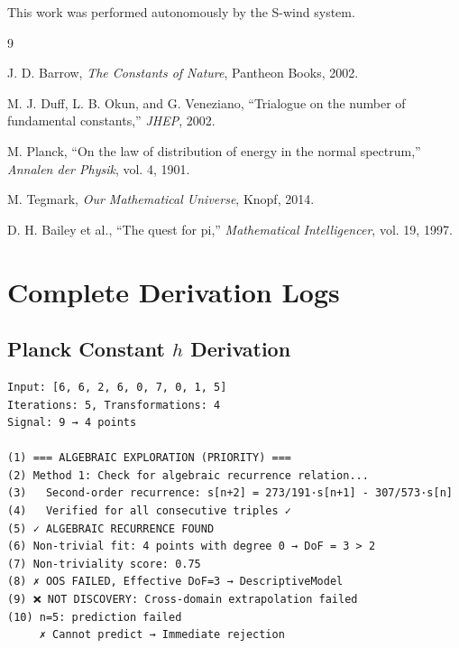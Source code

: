 \documentclass[11pt,a4paper]{article}
\begin{document}
This work was performed autonomously by the S-wind system.


\begin{thebibliography}{9}

J. D. Barrow, \textit{The Constants of Nature}, Pantheon Books, 2002.

M. J. Duff, L. B. Okun, and G. Veneziano, ``Trialogue on the number of fundamental constants,'' \textit{JHEP}, 2002.

M. Planck, ``On the law of distribution of energy in the normal spectrum,'' \textit{Annalen der Physik}, vol. 4, 1901.

M. Tegmark, \textit{Our Mathematical Universe}, Knopf, 2014.

D. H. Bailey et al., ``The quest for pi,'' \textit{Mathematical Intelligencer}, vol. 19, 1997.

\end{thebibliography}

\appendix

\section{Complete Derivation Logs}
\label{app:derivation}

\subsection{Planck Constant $h$ Derivation}

\begin{verbatim}
Input: [6, 6, 2, 6, 0, 7, 0, 1, 5]
Iterations: 5, Transformations: 4
Signal: 9 → 4 points

(1) === ALGEBRAIC EXPLORATION (PRIORITY) ===
(2) Method 1: Check for algebraic recurrence relation...
(3)   Second-order recurrence: s[n+2] = 273/191·s[n+1] - 307/573·s[n]
(4)   Verified for all consecutive triples ✓
(5) ✓ ALGEBRAIC RECURRENCE FOUND
(6) Non-trivial fit: 4 points with degree 0 → DoF = 3 > 2
(7) Non-triviality score: 0.75
(8) ✗ OOS FAILED, Effective DoF=3 → DescriptiveModel
(9) ❌ NOT DISCOVERY: Cross-domain extrapolation failed
(10) n=5: prediction failed
     ✗ Cannot predict → Immediate rejection
\end{verbatim}
\end{document}
